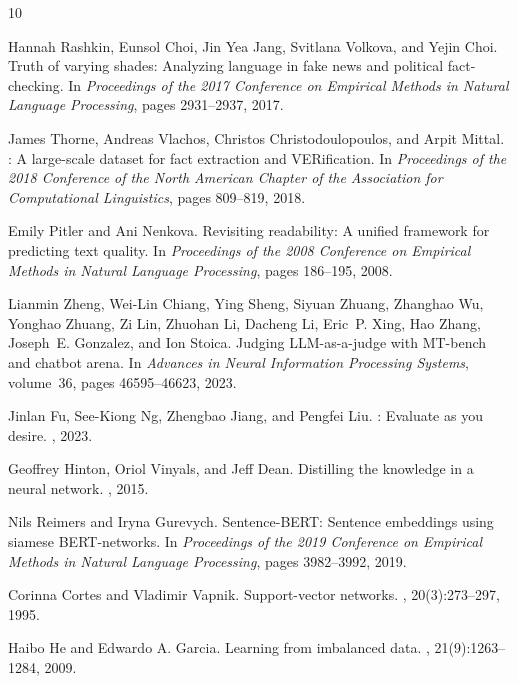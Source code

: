\documentclass[11pt,a4paper]{article}
\begin{document}
\begin{thebibliography}{10}

Hannah Rashkin, Eunsol Choi, Jin Yea Jang, Svitlana Volkova, and Yejin Choi.
\newblock Truth of varying shades: Analyzing language in fake news and political fact-checking.
\newblock In {\em Proceedings of the 2017 Conference on Empirical Methods in Natural Language Processing}, pages 2931--2937, 2017.

James Thorne, Andreas Vlachos, Christos Christodoulopoulos, and Arpit Mittal.
: A large-scale dataset for fact extraction and {VERification}.
\newblock In {\em Proceedings of the 2018 Conference of the North American Chapter of the Association for Computational Linguistics}, pages 809--819, 2018.

Emily Pitler and Ani Nenkova.
\newblock Revisiting readability: A unified framework for predicting text quality.
\newblock In {\em Proceedings of the 2008 Conference on Empirical Methods in Natural Language Processing}, pages 186--195, 2008.

Lianmin Zheng, Wei-Lin Chiang, Ying Sheng, Siyuan Zhuang, Zhanghao Wu, Yonghao Zhuang, Zi Lin, Zhuohan Li, Dacheng Li, Eric~P. Xing, Hao Zhang, Joseph~E. Gonzalez, and Ion Stoica.
\newblock Judging {LLM}-as-a-judge with {MT}-bench and chatbot arena.
\newblock In {\em Advances in Neural Information Processing Systems}, volume~36, pages 46595--46623, 2023.

Jinlan Fu, See-Kiong Ng, Zhengbao Jiang, and Pengfei Liu.
: Evaluate as you desire.
, 2023.

Geoffrey Hinton, Oriol Vinyals, and Jeff Dean.
\newblock Distilling the knowledge in a neural network.
, 2015.

Nils Reimers and Iryna Gurevych.
\newblock Sentence-{BERT}: Sentence embeddings using siamese {BERT}-networks.
\newblock In {\em Proceedings of the 2019 Conference on Empirical Methods in Natural Language Processing}, pages 3982--3992, 2019.

Corinna Cortes and Vladimir Vapnik.
\newblock Support-vector networks.
, 20(3):273--297, 1995.

Haibo He and Edwardo A. Garcia.
\newblock Learning from imbalanced data.
, 21(9):1263--1284, 2009.


\end{thebibliography}
\end{document}
